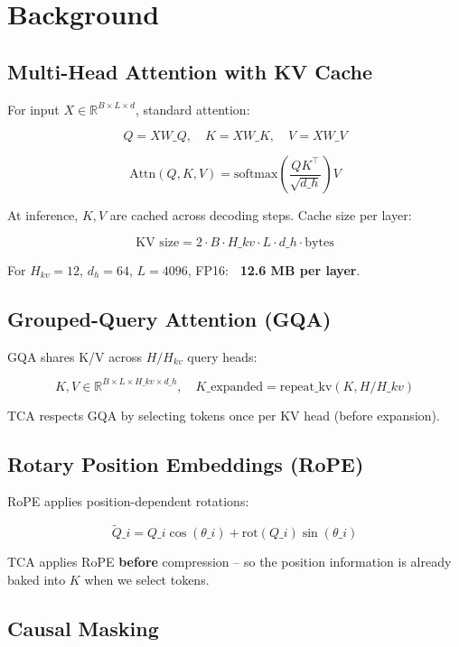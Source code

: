\section{Background}

\subsection{Multi-Head Attention with KV Cache}

For input $X \in \mathbb{R}^{B \times L \times d}$, standard attention:

\[
Q = X W\_Q, \quad K = X W\_K, \quad V = X W\_V
\tag{3.1}
\]

\[
\text{Attn}(Q, K, V) = \text{softmax}\!\left(\frac{Q K^\top}{\sqrt{d\_h}}\right) V
\tag{3.2}
\]

At inference, $K, V$ are cached across decoding steps. Cache size per layer:

\[
\text{KV size} = 2 \cdot B \cdot H\_{kv} \cdot L \cdot d\_h \cdot \text{bytes}
\tag{3.3}
\]

For $H_{kv} = 12$, $d_h = 64$, $L = 4096$, FP16: \textbf{~12.6 MB per layer}.

\subsection{Grouped-Query Attention (GQA)}

GQA shares K/V across $H/H_{kv}$ query heads:

\[
K, V \in \mathbb{R}^{B \times L \times H\_{kv} \times d\_h}, \quad
K\_{\text{expanded}} = \text{repeat\_kv}(K, H/H\_{kv})
\tag{3.4}
\]

TCA respects GQA by selecting tokens once per KV head (before expansion).

\subsection{Rotary Position Embeddings (RoPE)}

RoPE applies position-dependent rotations:

\[
\tilde{Q}\_i = Q\_i \cos(\theta\_i) + \text{rot}(Q\_i) \sin(\theta\_i)
\tag{3.5}
\]

TCA applies RoPE \textbf{before} compression -- so the position information is 
already baked into $K$ when we select tokens.

\subsection{Causal Masking}

